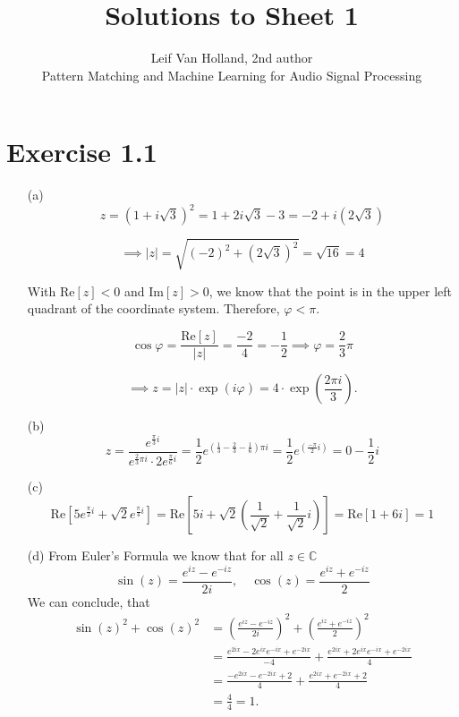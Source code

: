\documentclass[12pt]{article}
\begin{document}
 
 
\title{Solutions to Sheet 1}
\author{Leif Van Holland, 2nd author \\
Pattern Matching and Machine Learning for Audio Signal Processing}

\maketitle

\section*{Exercise 1.1}
\begin{itemize}
    \item[(a)] \[z = \left(1+i\sqrt{3}\right)^2 = 1+2i\sqrt{3}-3=-2+i(2\sqrt{3})\]
    
     \[\implies |z| = \sqrt{(-2)^2 + (2\sqrt{3})^2} = \sqrt{16} = 4\]
     
     With $\text{Re}[z] < 0$ and $\text{Im}[z] > 0$, we know that the point is in the upper left quadrant of the coordinate system. Therefore, $\varphi < \pi$.
     
     \[\cos \varphi = \frac{\text{Re}[z]}{|z|} = \frac{-2}{4} = -\frac{1}{2} \implies \varphi = \frac{2}{3}\pi\]
     
     \[\implies z = |z|\cdot \exp(i\varphi) = 4\cdot\exp(\frac{2\pi i}{3}).\]
     
     \item[(b)] \[z=\frac{e^{\frac{\pi}{3}i}}{e^{\frac{2}{3}\pi i}\cdot 2e^{\frac{\pi}{6}i}} = \frac{1}{2}e^{(\frac{1}{3}-\frac{2}{3}-\frac{1}{6})\pi i} = \frac{1}{2}e^{(\frac{-\pi}{2}i)} = 0-\frac{1}{2}i\]
     
     \item[(c)] \[\text{Re}\left[5e^{\frac{\pi}{2}i}+\sqrt{2}e^{\frac{\pi}{4}i} \right] = \text{Re}\left[5i + \sqrt{2}(\frac{1}{\sqrt{2}}+\frac{1}{\sqrt{2}}i)\right] = \text{Re}\left[ 1 + 6i \right] = 1\]
     
     \item [(d)] From Euler's Formula we know that for all $z\in\mathbb{C}$
     \[ \sin(z) = \frac{e^{iz}-e^{-iz}}{2i},\quad \cos(z) = \frac{e^{iz}+e^{-iz}}{2} \]
     We can conclude, that
     \begin{align*}
         \sin(z)^2 + \cos(z)^2 &= \left(\frac{e^{iz}-e^{-iz}}{2i}\right)^2 + \left(\frac{e^{iz}+e^{-iz}}{2}\right)^2 \\
         &= \frac{e^{2ix}-2e^{ix}e^{-ix}+e^{-2ix}}{-4} + \frac{e^{2ix}+2e^{ix}e^{-ix}+e^{-2ix}}{4} \\
         &= \frac{-e^{2ix}-e^{-2ix}+2}{4} + \frac{e^{2ix}+e^{-2ix}+2}{4} \\
         &= \frac{4}{4} = 1.
     \end{align*}
     
\end{itemize}
\end{document}

